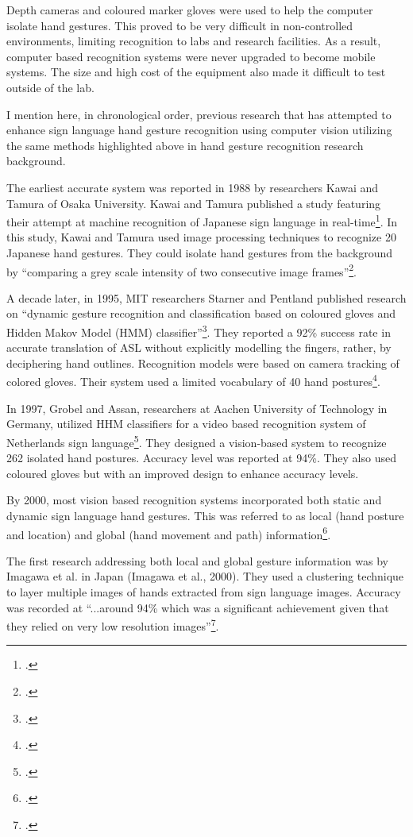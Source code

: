 Depth cameras and coloured marker gloves were used to help the computer isolate hand gestures. This proved to be very difficult in non-controlled environments, limiting recognition to labs and research facilities. As a result, computer based recognition systems were never upgraded to become mobile systems. The size and high cost of the equipment also made it difficult to test outside of the lab.  

I mention here, in chronological order, previous research that has attempted to enhance sign language hand gesture recognition using computer vision utilizing the same methods highlighted above in hand gesture recognition research background.

The earliest accurate system was reported in 1988 by researchers Kawai and Tamura of Osaka University. Kawai and Tamura published a study featuring their attempt at machine recognition of Japanese sign language in real-time\footcite{Tamura1988}. In this study, Kawai and Tamura used image processing techniques to recognize 20 Japanese hand gestures. They could isolate hand gestures from the background by ``comparing a grey scale intensity of two consecutive image frames''\footcite{Tamura1988}.

A decade later, in 1995, MIT researchers Starner and Pentland published research on ``dynamic gesture recognition and classification based on coloured gloves and Hidden Makov Model (HMM) classifier''\footcite{Starner1995b}. They reported a 92\% success rate in accurate translation of ASL without explicitly modelling the fingers, rather, by deciphering hand outlines. Recognition models were based on camera tracking of colored gloves. Their system used a limited vocabulary of 40 hand postures\footcite{Starner1995b}. 

In 1997, Grobel and Assan, researchers at Aachen University of Technology in Germany, utilized HHM classifiers for a video based recognition system of Netherlands sign language\footcite{Grobel1997}. They designed a vision-based system to recognize 262 isolated hand postures. Accuracy level was reported at 94\%. They also used coloured gloves but with an improved design to enhance accuracy levels. 

By 2000, most vision based recognition systems incorporated both static and dynamic sign language hand gestures. This was referred to as local (hand posture and location) and global (hand movement and path) information\footcite{Imagawa2000}.

The first research addressing both local and global gesture information was by Imagawa et al. in Japan (Imagawa et al., 2000). They used a clustering technique to layer multiple images of hands extracted from sign language images. Accuracy was recorded at ``...around 94\% which was a significant achievement given that they relied on very low resolution images''\footcite{Premaratne2010}.


